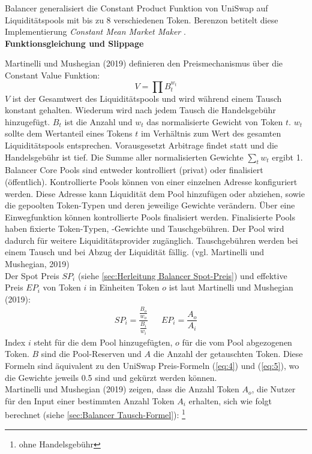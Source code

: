\documentclass[12pt,a4paper,titlepage,oneside,english]{article}
\begin{document}
Balancer generalisiert die Constant Product Funktion von UniSwap auf Liquiditätspools mit bis zu 8 verschiedenen Token. Berenzon betitelt diese Implementierung \textit{Constant Mean Market Maker} \citep{Berenzon2020}.\\

\textbf{Funktionsgleichung und Slippage}

Martinelli und Mushegian (2019) definieren den Preismechanismus über die Constant Value Funktion:  
\begin{equation}
V = \prod B^{w_{t}}_{t} \label{eq:10}
\end{equation}
$V$ ist der Gesamtwert des Liquiditätspools und wird während einem Tausch konstant gehalten. Wiederum wird nach jedem Tausch die Handelsgebühr hinzugefügt. $B_{t}$ ist die Anzahl und $w_{t}$ das normalisierte Gewicht von Token $t$.
$w_{t}$ sollte dem Wertanteil eines Tokens $t$ im Verhältnis zum Wert des gesamten Liquiditätspools entsprechen. Vorausgesetzt Arbitrage findet statt und die Handelsgebühr ist tief. Die Summe aller normalisierten Gewichte $ \sum_{t} w_{t}$ ergibt 1. \\
Balancer Core Pools sind entweder kontrolliert (privat) oder finalisiert (öffentlich). Kontrollierte Pools können von einer einzelnen Adresse konfiguriert werden. Diese Adresse kann Liquidität dem Pool hinzufügen oder abziehen, sowie die gepoolten Token-Typen und deren jeweilige Gewichte verändern. Über eine Einwegfunktion können kontrollierte Pools finalisiert werden. Finalisierte Pools haben fixierte Token-Typen, -Gewichte und Tauschgebühren. Der Pool wird dadurch für weitere Liquiditätsprovider zugänglich. Tauschgebühren werden bei einem Tausch und bei Abzug der Liquidität fällig. (vgl. Martinelli und Mushegian, 2019) \\
Der Spot Preis $SP_{i}$ (siehe \ref{sec:Herleitung Balancer Spot-Preis}) und effektive Preis $EP_{i}$ von Token $i$ in Einheiten Token $o$ ist laut Martinelli und Mushegian (2019): 
\begin{align}
SP_{i} = \dfrac{\frac{B_{o}}{w_{o}}}{\frac{B_{i}}{w_{i}}}   && EP_{i}=\dfrac{A_{o}}{A_{i}}\label{eq:11} 
\end{align} %
Index $i$ steht für die dem Pool hinzugefügten, $o$ für die vom Pool abgezogenen Token. $B$ sind die Pool-Reserven und $A$ die Anzahl der getauschten Token. Diese Formeln sind äquivalent zu den UniSwap Preis-Formeln (\ref{eq:4}) und (\ref{eq:5}), wo die Gewichte jeweils 0.5 sind und gekürzt werden können.\\
Martinelli und Mushegian (2019) zeigen, dass die Anzahl Token $A_{o}$, die Nutzer für den Input einer bestimmten Anzahl Token $A_{i}$ erhalten, sich wie folgt berechnet (siehe \ref{sec:Balancer Tausch-Formel}): \footnote{ohne Handelsgebühr} 
\end{document}
